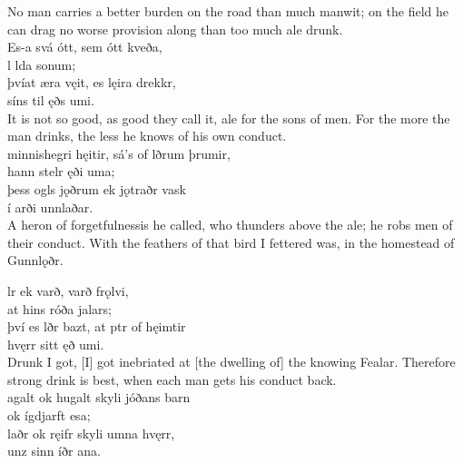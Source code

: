 \bvb No man carries a better burden on the road than much manwit; on the field he can drag no worse provision along than too much ale drunk. \\

\bva Es-a svá ótt, \hld sem ótt kveða, \\%
\ind {}l lda sonum; \\%
þvíat æra vęit, \hld es lęira drekkr, \\%
\ind síns til ęðs umi.\\%

\bvb It is not so good, as good they call it, ale for the sons of men. For the more the man drinks, the less he knows of his own conduct. \\

\bva {}minnishegri hęitir, \hld sá's of lðrum þrumir, \\%
\ind hann stelr ęði uma; \\%
þess ogls jǫðrum \hld ek jǫtraðr vask \\%
\ind í arði unnlaðar.\\%

\bvb A heron of forgetfulness\footnotemark[13] is he called, who thunders above the ale; he robs men of their conduct. With the feathers of that bird I fettered was, in the homestead of Gunnlǫðr. \\

\bva {}lr ek varð, \hld varð frǫlvi, \\%
\ind at hins róða jalars; \\%
því es lðr bazt, \hld at ptr of hęimtir \\%
\ind hvęrr sitt ęð umi.\\%

\bvb Drunk I got, [I] got inebriated at [the dwelling of] the knowing Fealar. Therefore strong drink is best, when each man gets his conduct back. \\

\bva {}agalt ok hugalt \hld skyli jóðans barn \\%
\ind ok ígdjarft esa; \\%
laðr ok ręifr \hld skyli umna hvęrr, \\%
\ind unz sinn íðr ana.\\%

